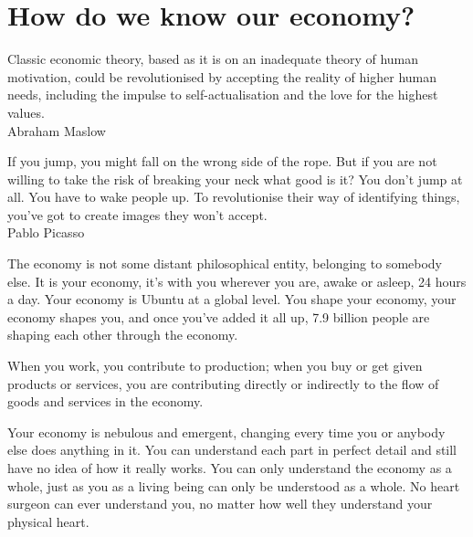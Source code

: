 ﻿\chapter{How do we know our economy?}
\label{chapter:know-our-economy}


\begin{chapterquotation}
Classic economic theory, based as it is on an inadequate theory of human motivation, could be revolutionised by accepting the reality of higher human needs, including the impulse to self-actualisation and the love for the highest values.\\
\raggedleft\textemdash Abraham Maslow


\centering
If you jump, you might fall on the wrong side of the rope. But if you are not willing to take the risk of breaking your neck what good is it? You don't jump at all. You have to wake people up. To revolutionise their way of identifying things, you've got to create images they won't accept.\\
\raggedleft\textemdash Pablo Picasso\cite{gardner-creating-minds}
\end{chapterquotation}


The economy is not some distant philosophical entity, belonging to somebody else. It is your economy, it's with you wherever you are, awake or asleep, 24 hours a day. Your economy is Ubuntu at a global level. You shape your economy, your economy shapes you, and once you've added it all up, 7.9 billion people are shaping each other through the economy.


When you work, you contribute to production; when you buy or get given products or services, you are contributing directly or indirectly to the flow of goods and services in the economy. 


Your economy is nebulous and emergent, changing every time you or anybody else does anything in it. You can understand each part in perfect detail and still have no idea of how it really works. You can only understand the economy as a whole, just as you as a living being can only be understood as a whole. No heart surgeon can ever understand you, no matter how well they understand your physical heart. 


